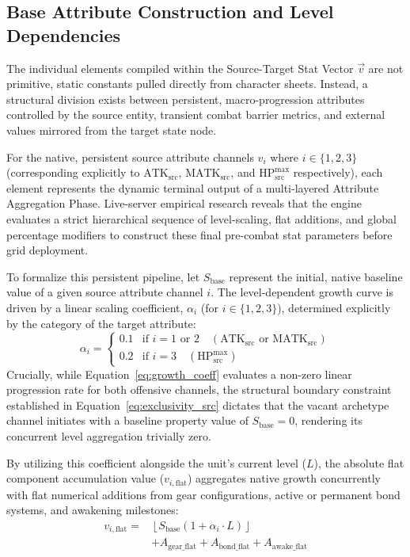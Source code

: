 \documentclass[twocolumn,10pt]{article}
\begin{document}
\subsection{Base Attribute Construction and Level Dependencies}
The individual elements compiled within the Source-Target Stat Vector $\vec{v}$ are not primitive, static constants pulled directly from character sheets. Instead, a structural division exists between persistent, macro-progression attributes controlled by the source entity, transient combat barrier metrics, and external values mirrored from the target state node. 

For the native, persistent source attribute channels $v_i$ where $i \in \{1, 2, 3\}$ (corresponding explicitly to $\text{ATK}_{\text{src}}$, $\text{MATK}_{\text{src}}$, and $\text{HP}_{\text{src}}^{\text{max}}$ respectively), each element represents the dynamic terminal output of a multi-layered Attribute Aggregation Phase. Live-server empirical research reveals that the engine evaluates a strict hierarchical sequence of level-scaling, flat additions, and global percentage modifiers to construct these final pre-combat stat parameters before grid deployment.

To formalize this persistent pipeline, let $S_{\text{base}}$ represent the initial, native baseline value of a given source attribute channel $i$. The level-dependent growth curve is driven by a linear scaling coefficient, $\alpha_i$ (for $ i \in \{1,2,3\}$), determined explicitly by the category of the target attribute:
\begin{equation}
\alpha_i = 
\begin{cases} 
0.1 & \text{if } i = 1 \text{ or } 2 \quad (\text{ATK}_{\text{src}} \text{ or } \text{MATK}_{\text{src}}) \\ 
0.2 & \text{if } i = 3 \quad (\text{HP}_{\text{src}}^{\text{max}}) 
\end{cases}
\label{eq:growth_coeff}
\end{equation}
Crucially, while Equation~\ref{eq:growth_coeff} evaluates a non-zero linear progression rate for both offensive channels, the structural boundary constraint established in Equation~\ref{eq:exclusivity_src} dictates that the vacant archetype channel initiates with a baseline property value of $S_{\text{base}} = 0$, rendering its concurrent level aggregation trivially zero.

By utilizing this coefficient alongside the unit's current level ($L$), the absolute flat component accumulation value ($v_{i,\text{flat}}$) aggregates native growth concurrently with flat numerical additions from gear configurations, active or permanent bond systems, and awakening milestones:
\begin{equation}
\begin{split}
v_{i,\text{flat}} = {} & \left\lfloor S_{\text{base}}\left(1 + \alpha_i \cdot L \right)\right\rfloor \\
& + A_{\text{gear\_flat}} + A_{\text{bond\_flat}} + A_{\text{awake\_flat}}
\end{split}
\label{eq:flat_stat_construction}
\end{equation}
\end{document}
